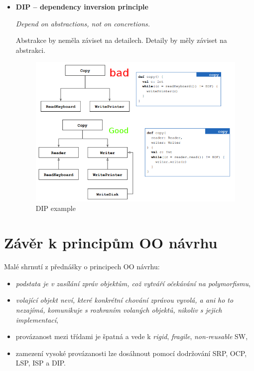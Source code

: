 \documentclass{szzclass}
\begin{document}
\begin{itemize}
      \item \textbf{DIP -- dependency inversion principle}

      \textit{Depend on abstractions, not on concretions.}

      Abstrakce by neměla záviset na detailech. Detaily by měly záviset na abstrakci.
      \begin{figure}[ht]
            \centering
            \includegraphics[width=1\textwidth]{topics/bi-wsi-si-09/dip.png}
            \caption{DIP example}
      \end{figure}


\end{itemize}

\section{Závěr k principům OO návrhu}

Malé shrnutí z přednášky o principech OO návrhu:

\begin{itemize}
      \item \textit{podstata je v zasílání zpráv objektům, což vytváří očekávání na polymorfismu},
      \item \textit{volající objekt neví, které konkrétní chování zprávou vyvolá, a ani ho to nezajímá,
      komunikuje s rozhraním volaných objektů, nikoliv s jejich implementací},
      \item provázanost mezi třídami je špatná a vede k \textit{rigid}, \textit{fragile}, \textit{non-reusable} SW,
      \item zamezení vysoké provázanosti lze dosáhnout pomocí dodržování SRP, OCP, LSP, ISP a DIP.
\end{itemize}
\end{document}

